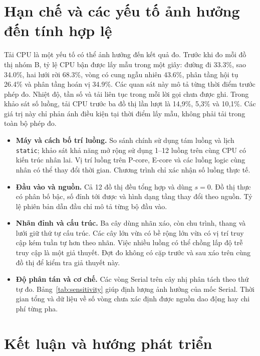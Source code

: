 \section{Hạn chế và các yếu tố ảnh hưởng đến tính hợp lệ}
Tải CPU là một yếu tố có thể ảnh hưởng đến kết quả đo. Trước khi đo mỗi đồ thị nhóm B, tỷ lệ CPU bận được lấy mẫu trong một giây: đường đi \num{33.3}\%, sao \num{34.0}\%, hai lưới rời \num{68.3}\%, vòng có cung ngẫu nhiên \num{43.6}\%, phân tầng hội tụ \num{26.4}\% và phân tầng hoán vị \num{34.9}\%. Các quan sát này mô tả từng thời điểm trước phép đo. Nhiệt độ, tần số và tải liên tục trong mỗi lời gọi chưa được ghi. Trong khảo sát số luồng, tải CPU trước ba đồ thị lần lượt là 14,9\%, 5,3\% và 10,1\%. Các giá trị này chỉ phản ánh điều kiện tại thời điểm lấy mẫu, không phải tải trong toàn bộ phép đo.

\begin{itemize}
\item \textbf{Máy và cách bố trí luồng.} So sánh chính sử dụng tám luồng và lịch \texttt{static}; khảo sát khả năng mở rộng sử dụng 1--12 luồng trên cùng CPU có kiến trúc nhân lai. Vị trí luồng trên P-core, E-core và các luồng logic cùng nhân có thể thay đổi thời gian. Chương trình chỉ xác nhận số luồng thực tế.
\item \textbf{Đầu vào và nguồn.} Cả 12 đồ thị đều tổng hợp và dùng $s=0$. Đồ thị thực có phân bố bậc, số đỉnh tới được và hình dạng tầng thay đổi theo nguồn. Tỷ lệ phiên bản dẫn đầu chỉ mô tả từng bộ đầu vào.
\item \textbf{Nhãn đỉnh và cấu trúc.} Ba cây dùng nhãn xáo, còn chu trình, thang và lưới giữ thứ tự cấu trúc. Các cây lớn vừa có bề rộng lớn vừa có vị trí truy cập kém tuần tự hơn theo nhãn. Việc nhiều luồng có thể chồng lấp độ trễ truy cập là một giả thuyết. Đợt đo không có cặp trước và sau xáo trên cùng đồ thị để kiểm tra giả thuyết này.
\item \textbf{Độ phân tán và cơ chế.} Các vòng Serial trên cây nhị phân tách theo thứ tự đo. Bảng~\ref{tab:sensitivity} giúp định lượng ảnh hưởng của mốc Serial. Thời gian tổng và dữ liệu về số vòng chưa xác định được nguồn dao động hay chi phí từng pha.
\end{itemize}

\section{Kết luận và hướng phát triển}
